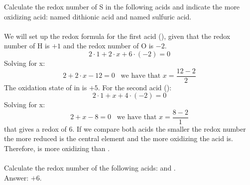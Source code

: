 \documentclass[main.tex]{subfiles}
\begin{document}
\begin{description}
\begin{example} %
Calculate the redox number of S in the following acids and indicate the more oxidizing acid:  named dithionic acid and  named sulfuric acid.\\
\\
We will set up the redox formula for the first acid (), given that the redox number of H is $+1$ and the redox number of O is $-2$.
\[2\cdot 1+2\cdot x+6\cdot (-2)=0\]
Solving for x: 
\[2 +2\cdot x-12=0\;\;\; \text{we have that } x=\frac{12-2}{2}\]
The oxidation state of  in  is $+5$. For the second acid ():
\[2\cdot 1+x+4\cdot (-2)=0\]
Solving for x: 
\[2 +x-8=0\;\;\; \text{we have that } x=\frac{8-2}{1}\]
that gives a redox of $6$. If we compare both acids the smaller the redox number the more reduced is the central element and the more oxidizing the acid is. Therefore,  is more oxidizing than . 
\\
\faDiamond\ \\
Calculate the redox number of the following acids:  and .\\
\flushright Answer: $+6$.
\end{example}%


\end{description}
\end{document}
